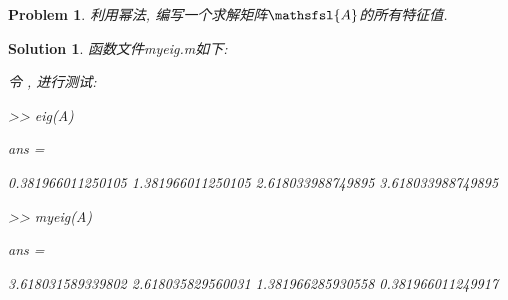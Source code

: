 \documentclass[a4paper, 12pt]{ctexart}
\let\oldlstinputlisting
\renewcommand{}[2][\empty]{
    \par\nolinenumbers\oldlstinputlisting[#1]{#2}\linenumbers\par
}
\let\oldlstlisting\lstlisting
\let\oldendlstlisting\endlstlisting
\renewenvironment{lstlisting}
    {\par\nolinenumbers\oldlstlisting}
    {\oldendlstlisting\endnolinenumbers\par}
\renewcommand{\lstinline}[2][]{\colorbox{lightgray}{\oldlstinline[#1]{#2}}}
\newcommand{\matlabinline}[1]{
    \lstinline[style=MATLAB-editor, basicstyle=\mlttfamily]{#1}}
\theoremstyle{plain}
\newtheorem{problem}{Problem}[section]
\theoremstyle{plain}
\theoremstyle{plain}
\theoremstyle{nonumberplain}
\newtheorem{solution}{Solution}
\newcommand*{\matr}[1]{\ensuremath{\mathsfsl{#1}}} %
\begin{document}
    \begin{problem}
        利用幂法, 编写一个求解矩阵$\matr{A}$的所有特征值.
    \end{problem}

    \begin{solution}
        函数文件myeig.m如下:

        

        令\matlabinline{A = [2 -1 0 0; -1 2 -1 0; 0 -1 2 -1; 0 0 -1 2]}, 进行测试:

        \begin{lstlisting}[
            caption=内置eig函数测试,
            style=MATLAB-editor,
            basicstyle=\mlttfamily\scriptsize,
            numberstyle={\color{black!33}\scriptsize\sffamily}
        ]
>> eig(A)

ans =
        
   0.381966011250105
   1.381966011250105
   2.618033988749895
   3.618033988749895
        \end{lstlisting}

        \begin{lstlisting}[
            caption=myeig.m测试,
            style=MATLAB-editor,
            basicstyle=\mlttfamily\scriptsize,
            numberstyle={\color{black!33}\scriptsize\sffamily}
        ]
>> myeig(A)

ans =
        
   3.618031589339802
   2.618035829560031
   1.381966285930558
   0.381966011249917
        \end{lstlisting}
    \end{solution}


\end{document}
